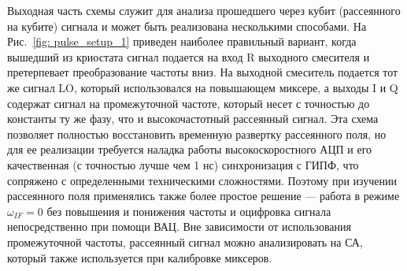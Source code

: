 Выходная часть схемы служит для анализа прошедшего через кубит (рассеянного на кубите) сигнала и может быть реализована несколькими способами. На Рис.~\ref{fig: pulse_setup_1} приведен наиболее правильный вариант, когда вышедший из криостата сигнал подается на вход R выходного смесителя и  претерпевает преобразование частоты вниз. На выходной смеситель подается тот же сигнал LO, который использовался на повышающем миксере, а выходы I и Q содержат сигнал на промежуточной частоте, который несет с точностью до константы ту же фазу, что и высокочастотный рассеянный сигнал. Эта схема позволяет полностью восстановить временную развертку рассеянного поля, но для ее реализации требуется наладка работы высокоскоростного АЦП и его качественная (с точностью лучше чем 1 нс) синхронизация с ГИПФ, что сопряжено с определенными техническими сложностями. Поэтому при изучении рассеянного поля применялись также более простое решение --- работа в режиме $\omega_{IF}=0$ без повышения и понижения частоты и оцифровка сигнала непосредственно при помощи ВАЦ. Вне зависимости от использования промежуточной частоты, рассеянный сигнал можно анализировать на СА, который также используется при калибровке миксеров. 

